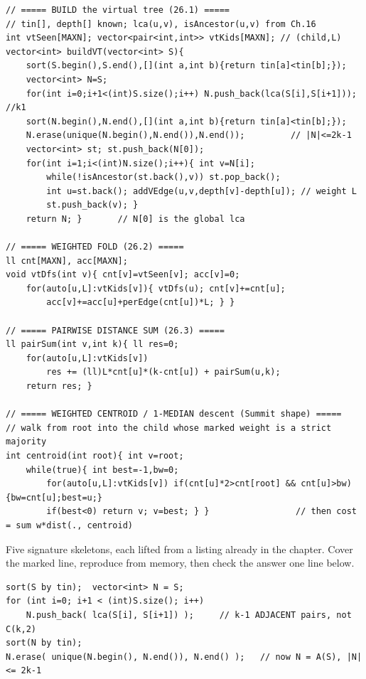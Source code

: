 \begin{lstlisting}[caption={Chapter 26 kit: the virtual-tree build (sort by tin, close under adjacent lca, dedup, monotone stack with depth-difference weights), the weighted fold, the pairwise distance sum, and a weighted-centroid descent -- one compact skeleton each, in one place. ASCII only, identifiers spelled without underscores.}, label={lst:c30-kit}]
// ===== BUILD the virtual tree (26.1) =====
// tin[], depth[] known; lca(u,v), isAncestor(u,v) from Ch.16
int vtSeen[MAXN]; vector<pair<int,int>> vtKids[MAXN]; // (child,L)
vector<int> buildVT(vector<int> S){
    sort(S.begin(),S.end(),[](int a,int b){return tin[a]<tin[b];});
    vector<int> N=S;
    for(int i=0;i+1<(int)S.size();i++) N.push_back(lca(S[i],S[i+1])); //k1
    sort(N.begin(),N.end(),[](int a,int b){return tin[a]<tin[b];});
    N.erase(unique(N.begin(),N.end()),N.end());         // |N|<=2k-1
    vector<int> st; st.push_back(N[0]);
    for(int i=1;i<(int)N.size();i++){ int v=N[i];
        while(!isAncestor(st.back(),v)) st.pop_back();
        int u=st.back(); addVEdge(u,v,depth[v]-depth[u]); // weight L
        st.push_back(v); }
    return N; }       // N[0] is the global lca

// ===== WEIGHTED FOLD (26.2) =====
ll cnt[MAXN], acc[MAXN];
void vtDfs(int v){ cnt[v]=vtSeen[v]; acc[v]=0;
    for(auto[u,L]:vtKids[v]){ vtDfs(u); cnt[v]+=cnt[u];
        acc[v]+=acc[u]+perEdge(cnt[u])*L; } }

// ===== PAIRWISE DISTANCE SUM (26.3) =====
ll pairSum(int v,int k){ ll res=0;
    for(auto[u,L]:vtKids[v])
        res += (ll)L*cnt[u]*(k-cnt[u]) + pairSum(u,k);
    return res; }

// ===== WEIGHTED CENTROID / 1-MEDIAN descent (Summit shape) =====
// walk from root into the child whose marked weight is a strict majority
int centroid(int root){ int v=root;
    while(true){ int best=-1,bw=0;
        for(auto[u,L]:vtKids[v]) if(cnt[u]*2>cnt[root] && cnt[u]>bw){bw=cnt[u];best=u;}
        if(best<0) return v; v=best; } }                 // then cost = sum w*dist(., centroid)
\end{lstlisting}


Five signature skeletons, each lifted from a listing already in the chapter. Cover the marked line,
reproduce from memory, then check the answer one line below.

\begin{lstlisting}[caption={Drill 1 -- close a marked set under lca (from lst:c30-build)}]
sort(S by tin);  vector<int> N = S;
for (int i=0; i+1 < (int)S.size(); i++)
    N.push_back( lca(S[i], S[i+1]) );     // k-1 ADJACENT pairs, not C(k,2)
sort(N by tin);
N.erase( unique(N.begin(), N.end()), N.end() );   // now N = A(S), |N| <= 2k-1
\end{lstlisting}

